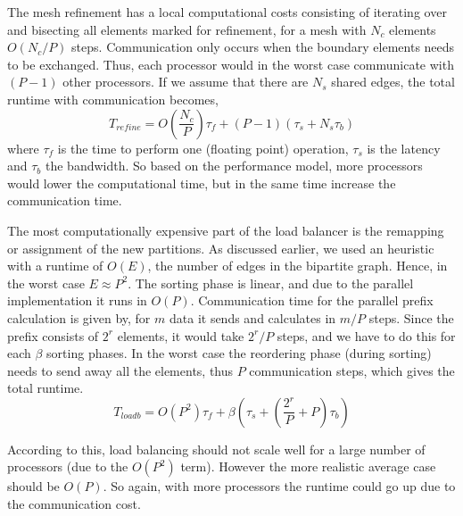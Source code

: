 The mesh refinement has a local computational costs consisting of
iterating over and bisecting all elements marked for refinement, for a
mesh with $N_c$ elements $O(N_c/P)$ steps. Communication only occurs
when the boundary elements needs to be exchanged. Thus, each processor
would in the worst case communicate with $(P-1)$ other processors. If
we assume that there are $N_s$ shared edges, the total runtime with
communication becomes,
\begin{equation}
\label{eq:refine_time}
  T_{refine} = O\left(\frac{N_c}{P} \right) \tau_f + (P-1)(\tau_s + N_s \tau_b)
\end{equation}
where $\tau_f$ is the time to perform one (floating point) operation,
$\tau_s$ is the latency and $\tau_b$ the bandwidth. So based on the
performance model, more processors would lower the computational time,
but in the same time increase the communication time.

The most computationally expensive part of the load balancer is the
remapping or assignment of the new partitions. As discussed earlier,
we used an heuristic with a runtime of $O(E)$, the number of edges in
the bipartite graph. Hence, in the worst case $ E \approx P^2$. The
sorting phase is linear, and due to the parallel implementation it
runs in $O(P)$. Communication time for the parallel prefix calculation
is given by, for $m$ data it sends and calculates in $m/P$
steps. Since the prefix consists of $2^r$ elements, it would take
$2^r/P$ steps, and we have to do this for each $\beta$ sorting
phases. In the worst case the reordering phase (during sorting) needs
to send away all the elements, thus $P$ communication steps, which
gives the total runtime.
\begin{equation}
  \label{eq:load_time}
  T_{loadb} = O(P^2) \tau_f + \beta \left( \tau_s + \left( \frac{2^r}{P} + P \right) \tau_b \right)
\end{equation}

According to this, load balancing should not scale well for a large
number of processors (due to the $O(P^2)$ term). However the more
realistic average case should be $O(P)$. So again, with more
processors the runtime could go up due to the communication cost.

